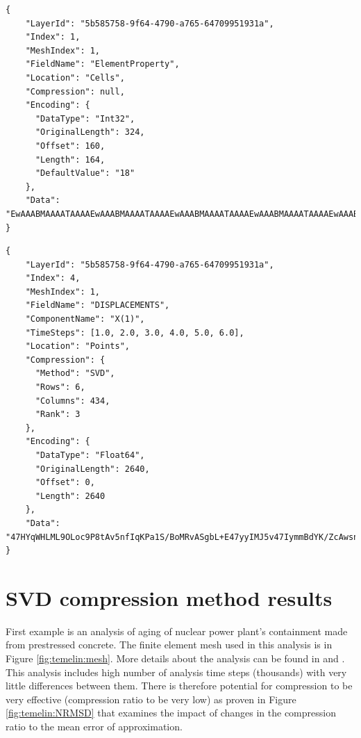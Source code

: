 \begin{lstlisting}[style=json,caption=Example of attribute.json document.,label=lst:attribute.json]
{
    "LayerId": "5b585758-9f64-4790-a765-64709951931a",
    "Index": 1,
    "MeshIndex": 1,
    "FieldName": "ElementProperty",
    "Location": "Cells",
    "Compression": null,
    "Encoding": {
      "DataType": "Int32",
      "OriginalLength": 324,
      "Offset": 160,
      "Length": 164,
      "DefaultValue": "18"
    },
    "Data": "EwAAABMAAAATAAAAEwAAABMAAAATAAAAEwAAABMAAAATAAAAEwAAABMAAAATAAAAEwAAABMAAAATAAAAEwAAAB..."
}
\end{lstlisting}

\begin{lstlisting}[style=json,caption=Example of result.json document.,label=lst:result.json]
{
    "LayerId": "5b585758-9f64-4790-a765-64709951931a",
    "Index": 4,
    "MeshIndex": 1,
    "FieldName": "DISPLACEMENTS",
    "ComponentName": "X(1)",
    "TimeSteps": [1.0, 2.0, 3.0, 4.0, 5.0, 6.0],
    "Location": "Points",
    "Compression": {
      "Method": "SVD",
      "Rows": 6,
      "Columns": 434,
      "Rank": 3
    },
    "Encoding": {
      "DataType": "Float64",
      "OriginalLength": 2640,
      "Offset": 0,
      "Length": 2640
    },
    "Data": "47HYqWHLML9OLoc9P8tAv5nfIqKPa1S/BoMRvASgbL+E47yyIMJ5v47IymmBdYK/ZcAwsn55IL+uuEUHN3swv1..."
}
\end{lstlisting}


\section{SVD compression method results}

First example is an analysis of aging of nuclear power plant's containment made from prestressed concrete. The finite element mesh used in this analysis is in Figure \ref{fig:temelin:mesh}. More details about the analysis can be found in \cite{Kruis2012} and \cite{Koudelka2009}. This analysis includes high number of analysis time steps (thousands) with very little differences between them. There is therefore potential for compression to be very effective (compression ratio to be very low) as proven in Figure \ref{fig:temelin:NRMSD} that examines the impact of changes in the compression ratio to the mean error of approximation.

